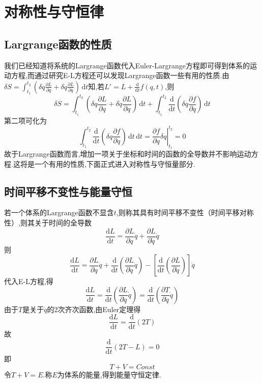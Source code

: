 \chapter{对称性与守恒律}
\section{Largrange函数的性质}
我们已经知道将系统的Largrange函数代入Euler-Largrange方程即可得到体系的运动方程,而通过研究E-L方程还可以发现Largrange函数一些有用的性质.由$\delta S=\int_{t_1}^{t_2} (\delta q \frac{\partial L}{\partial q} + \delta \dot{q} \frac{\partial L}{\partial q})\,\mathrm{d}t $知,若$L'=L+\frac{\mathrm{d}}{\mathrm{d}t}f(q,t)$,则
\begin{equation}
\delta S=\int_{t_1}^{t_2} (\delta q \frac{\partial L}{\partial q} + \delta \dot{q} \frac{\partial L}{\partial q})\,\mathrm{d}t
+ \int_{t_1}^{t_2}\frac{\mathrm{d}}{\mathrm{d}t}\left(\delta q \frac{\partial f}{\partial q}\right)\,\mathrm{d}t
\end{equation}
第二项可化为
\begin{equation}
\int_{t_1}^{t_2}\frac{\mathrm{d}}{\mathrm{d}t}\left(\delta q \frac{\partial f}{\partial q}\right)\,\mathrm{d}t\,\mathrm{d}t
= 
\left.
\frac{\partial f}{\partial q}\delta q 
\right|_{t_1}^{t_2}
= 0
\end{equation}
故于Largrange函数而言,增加一项关于坐标和时间的函数的全导数并不影响运动方程.这将是一个有用的性质,下面正式进入对称性与守恒量部分.

\section{时间平移不变性与能量守恒}
若一个体系的Largrange函数不显含$t$,则称其具有时间平移不变性（时间平移对称性）,则其关于时间的全导数
\begin{equation}
\frac{\mathrm{d}L}{\mathrm{d}t} = 
\frac{\partial L}{\partial q}\dot{q} +
\frac{\partial L}{\partial \dot{q}}\ddot{q}
\end{equation}
则
\begin{equation}
\frac{\mathrm{d}L}{\mathrm{d}t} = 
\frac{\partial L}{\partial q}\dot{q} +
\frac{\mathrm{d}}{\mathrm{d}t}\left(\frac{\partial L}{\partial \dot{q}}\dot{q}\right) - 
\left[
\frac{\mathrm{d}}{\mathrm{d}t}\left(\frac{\partial L}{\partial \dot{q}}\right)
\right]\dot{q}
\end{equation}
代入E-L方程,得
\begin{equation}
\frac{\mathrm{d}L}{\mathrm{d}t} = 
\frac{\mathrm{d}}{\mathrm{d}t}\left(\frac{\partial L}{\partial \dot{q}}\dot{q}\right) = 
\frac{\mathrm{d}}{\mathrm{d}t}\left(\frac{\partial T}{\partial \dot{q}}\dot{q}\right)
\end{equation}
由于$T$是关于$\dot{q}$的2次齐次函数,由Euler定理得
\begin{equation}
\frac{\mathrm{d}L}{\mathrm{d}t} =
\frac{\mathrm{d}}{\mathrm{d}t}(2T)
\end{equation}
故
\begin{equation}
\frac{\mathrm{d}}{\mathrm{d}t}(2T-L) = 0
\end{equation}
即
\begin{equation}
T+V = Const
\end{equation}
令$T+V=E$.称$E$为体系的能量,得到能量守恒定律.

